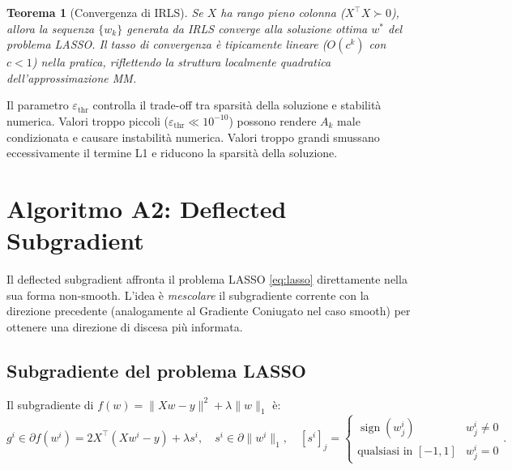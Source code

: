\documentclass[11pt, a4paper, twoside]{book}
\theoremstyle{definition}
\theoremstyle{plain}
\newtheorem{thm}{Teorema}[chapter]
\theoremstyle{remark}
\DeclareMathOperator{\sign}{sign}
\begin{document}
\begin{thm}[Convergenza di IRLS]
Se $X$ ha rango pieno colonna ($X^\top X \succ 0$), allora la sequenza $\{w_k\}$ generata da IRLS
converge alla soluzione ottima $w^*$ del problema LASSO. Il tasso di convergenza è tipicamente
\emph{lineare} ($O(c^k)$ con $c < 1$) nella pratica, riflettendo la struttura localmente quadratica
dell'approssimazione MM.
\end{thm}

\begin{warningbox}
Il parametro $\varepsilon_{\mathrm{thr}}$ controlla il trade-off tra sparsità della soluzione e
stabilità numerica. Valori troppo piccoli ($\varepsilon_{\mathrm{thr}} \ll 10^{-10}$) possono
rendere $A_k$ male condizionata e causare instabilità numerica. Valori troppo grandi smussano
eccessivamente il termine L1 e riducono la sparsità della soluzione.
\end{warningbox}

\section{Algoritmo A2: Deflected Subgradient}
\label{sec:deflected-subgradient}

Il deflected subgradient affronta il problema LASSO \eqref{eq:lasso} direttamente nella sua forma
non-smooth. L'idea è \emph{mescolare} il subgradiente corrente con la direzione precedente
(analogamente al Gradiente Coniugato nel caso smooth) per ottenere una direzione di discesa
più informata.

\subsection{Subgradiente del problema LASSO}
\label{sec:complessita-nonsmooth}

Il subgradiente di $f(w) = \|Xw-y\|^2 + \lambda\|w\|_1$ è:
\[
  g^i \in \partial f(w^i) = 2X^\top(Xw^i - y) + \lambda s^i,
  \quad s^i \in \partial\|w^i\|_1, \quad [s^i]_j = \begin{cases} \sign(w^i_j) & w^i_j \neq 0 \\ \text{qualsiasi in } [-1,1] & w^i_j = 0 \end{cases}.
\]
\end{document}
